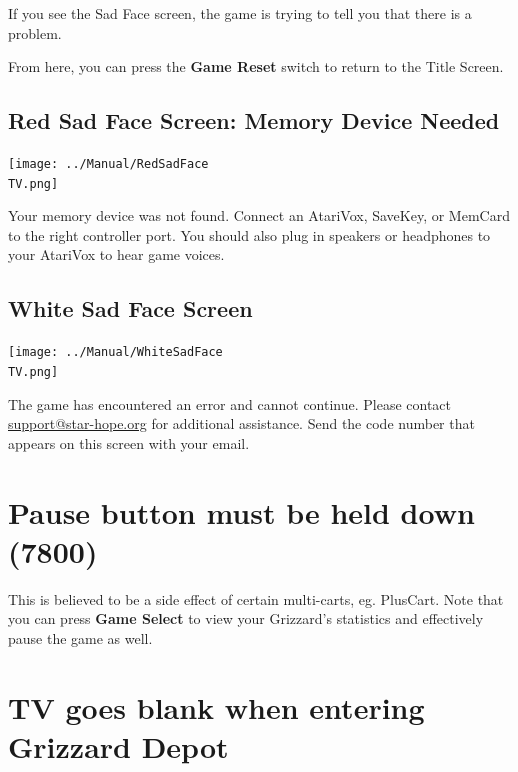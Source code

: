 \documentclass[10pt,twocolumn,openany,article]{memoir}
\newcommand\TV{NTSC}
\newcommand\TV{PAL}
\newcommand\TV{SECAM}
\begin{document}
If you  see the Sad  Face screen,  the game is  trying to tell  you that
there is a problem.

From here, you can press the \textbf{Game Reset} switch to return to the
Title Screen.

\ifdefined\ATARIAGESAVE\else\ifdefined\NOSAVE\else

\subsection{Red Sad Face Screen: Memory Device Needed}

\texttt{[image: ../Manual/RedSadFace\\TV.png]}

Your  memory device  was not  found.  Connect an  AtariVox, SaveKey,  or
MemCard to the  right controller port. You should also  plug in speakers
or headphones to your AtariVox to hear game voices.

\fi\fi

\subsection{White Sad Face Screen}

\texttt{[image: ../Manual/WhiteSadFace\\TV.png]}

The game  has encountered an  error and cannot continue.  Please contact
\href{mailto:support@star-hope.org}{support@star-hope.org}           for
additional assistance. Send the code  number that appears on this screen
with your email.

\ifdefined\ATARIAGESAVE\else

\section{Pause button must be held down (7800)}

This  is believed  to  be  a side  effect  of  certain multi-carts,  eg.
PlusCart.  Note that  you can  press \textbf{Game  Select} to  view your
Grizzard's statistics and effectively pause the game as well.

\fi

\ifdefined\NOSAVE\else\ifdefined\ATARIAGESAVE\else

\section{TV goes blank when entering Grizzard Depot}
\end{document}

